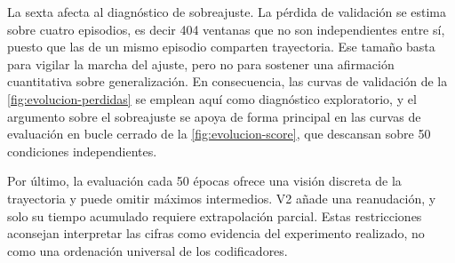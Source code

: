 La sexta afecta al diagn\'ostico de sobreajuste. La p\'erdida de validaci\'on se estima
sobre cuatro episodios, es decir \num{404} ventanas que no son independientes entre s\'i,
puesto que las de un mismo episodio comparten trayectoria. Ese tama\~no basta para vigilar
la marcha del ajuste, pero no para sostener una afirmaci\'on cuantitativa sobre
generalizaci\'on. En consecuencia, las curvas de validaci\'on de la
\cref{fig:evolucion-perdidas} se emplean aqu\'i como diagn\'ostico exploratorio, y el
argumento sobre el sobreajuste se apoya de forma principal en las curvas de evaluaci\'on
en bucle cerrado de la \cref{fig:evolucion-score}, que descansan sobre \num{50}
condiciones independientes.

Por \'ultimo, la evaluaci\'on cada \num{50} \'epocas ofrece una visi\'on discreta de la
trayectoria y puede omitir m\'aximos intermedios. V2 a\~nade una reanudaci\'on, y solo su
tiempo acumulado requiere extrapolaci\'on parcial. Estas restricciones aconsejan
interpretar las cifras como evidencia del experimento realizado, no como una ordenaci\'on
universal de los codificadores.
